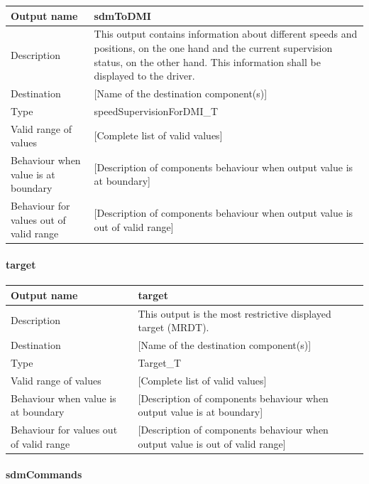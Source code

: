 \begin{longtable}{p{}p{}}
\toprule
Output name				& sdmToDMI \\
\midrule
Description				& This output contains information about different speeds and positions, on the one hand and the current supervision status, on the other hand. This information shall be displayed to the driver. \\
\midrule
Destination				& [Name of the destination component(s)] \\ 
\midrule
Type					& speedSupervisionForDMI\_T \\
\midrule
Valid range of values	& [Complete list of valid values] \\
\midrule
Behaviour when value is at boundary	& [Description of components behaviour when output value is at boundary] \\
\midrule
Behaviour for values out of valid range	& [Description of components behaviour when output value is out of valid range] \\
\bottomrule
\end{longtable}


\paragraph{target}

\begin{longtable}{p{}p{}}
\toprule
Output name				& target \\
\midrule
Description				& This output is the most restrictive displayed target (MRDT). \\
\midrule
Destination				& [Name of the destination component(s)] \\ 
\midrule
Type					& Target\_T \\
\midrule
Valid range of values	& [Complete list of valid values] \\
\midrule
Behaviour when value is at boundary	& [Description of components behaviour when output value is at boundary] \\
\midrule
Behaviour for values out of valid range	& [Description of components behaviour when output value is out of valid range] \\
\bottomrule
\end{longtable}


\paragraph{sdmCommands}

